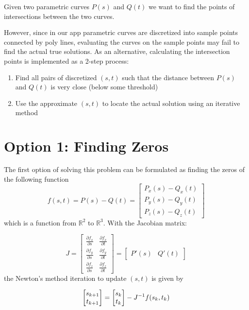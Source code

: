 \documentclass[11pt]{article}
\begin{document}
Given two parametric curves $P(s)$ and $Q(t)$ we want to find the points of intersections
between the two curves.

However, since in our app parametric curves are discretized into sample points connected by poly lines, evaluating the curves
on the sample points may fail to find the actual true solutions. As an alternative, calculating the intersection
points is implemented as a 2-step process:

\begin{enumerate}
  \item Find all pairs of discretized $(s,t)$ such that the distance between $P(s)$ and $Q(t)$ is very close (below some threshold)
  \item Use the approximate $(s,t)$ to locate the actual solution using an iterative method
\end{enumerate}

\section*{Option 1: Finding Zeros}
The first option of solving this problem can be formulated as finding the zeros of the following function
$$f(s,t) = P(s) - Q(t) = \begin{bmatrix}
    P_x(s) - Q_x(t) \\
    P_y(s) - Q_y(t) \\
    P_z(s) - Q_z(t)
  \end{bmatrix}$$
which is a function from $\mathbb{R}^2$ to $\mathbb{R}^3$. With the Jacobian matrix:

$$
  J =
  \begin{bmatrix}
    \frac{\partial f_x}{\partial s} & \frac{\partial f_x}{\partial t} \\
    \frac{\partial f_y}{\partial s} & \frac{\partial f_y}{\partial t} \\
    \frac{\partial f_z}{\partial s} & \frac{\partial f_z}{\partial t}
  \end{bmatrix}
  =
  \begin{bmatrix}
    P'(s) & Q'(t)
  \end{bmatrix}
$$
the Newton's method iteration to update $(s,t)$ is given by

$$
  \begin{bmatrix}
    s_{k+1} \\t_{k+1}
  \end{bmatrix}
  =
  \begin{bmatrix}
    s_{k} \\t_{k}
  \end{bmatrix}
  -
  J^{-1} f(s_k, t_k)                                                 \\
$$
\end{document}
